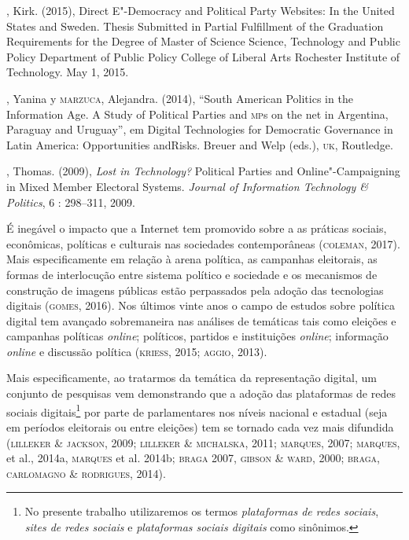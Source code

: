 \begin{bibliohedra}
, Kirk. (2015), Direct E"-Democracy and Political Party Websites:
In the United States and Sweden. Thesis Submitted in Partial Fulfillment
of the Graduation Requirements for the Degree of Master of Science
Science, Technology and Public Policy Department of Public Policy
College of Liberal Arts Rochester Institute of Technology. May 1, 2015.

, Yanina y \textsc{marzuca}, Alejandra. (2014), ``South American Politics in
the Information Age. A Study of Political Parties and \textsc{mp}s on the net in
Argentina, Paraguay and Uruguay'', em Digital Technologies for
Democratic Governance in Latin America: Opportunities andRisks. Breuer
and Welp (eds.), \textsc{uk}, Routledge.

, Thomas. (2009), \textit{Lost in Technology?} Political Parties and
Online"-Campaigning in Mixed Member Electoral Systems. \textit{Journal of
Information Technology \& Politics}, 6 : 298--311, 2009.
\end{bibliohedra}



\begin{flushright}
\end{flushright}

\noindent{}É inegável o impacto que a Internet tem promovido sobre a as práticas
sociais, econômicas, políticas e culturais nas sociedades contemporâneas
(\textsc{coleman}, 2017). Mais especificamente em relação à arena política, as
campanhas eleitorais, as formas de interlocução entre sistema político e
sociedade e os mecanismos de construção de imagens públicas estão
perpassados pela adoção das tecnologias digitais (\textsc{gomes}, 2016). Nos
últimos vinte anos o campo de estudos sobre política digital tem
avançado sobremaneira nas análises de temáticas tais como eleições e
campanhas políticas \textit{online}; políticos, partidos e instituições \textit{online};
informação \textit{online} e discussão política (\textsc{kriess}, 2015; \textsc{aggio}, 2013).

Mais especificamente, ao tratarmos da temática da representação digital,
um conjunto de pesquisas vem demonstrando que a adoção das plataformas
de redes sociais digitais\footnote{No presente trabalho utilizaremos os
  termos \textit{plataformas de redes sociais}, \textit{sites de redes sociais} e
  \textit{plataformas sociais digitais} como sinônimos.} por parte de
parlamentares nos níveis nacional e estadual (seja em períodos
eleitorais ou entre eleições) tem se tornado cada vez mais difundida
(\textsc{lilleker \& jackson}, 2009; \textsc{lilleker \& michalska}, 2011; \textsc{marques}, 2007; \textsc{marques}, et al., 2014a, \textsc{marques} et al. 2014b; \textsc{braga} 2007, \textsc{gibson \&
ward}, 2000; \textsc{braga, carlomagno \& rodrigues}, 2014).

